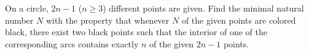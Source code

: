 On a circle, $2n - 1$ ($n \geq 3$) different points are given. Find the minimal natural number $N$ with the property that whenever $N$ of the given points are colored black, there exist two black points such that the interior of one of the corresponding arcs contains exactly $n$ of the given $2n - 1$ points.
